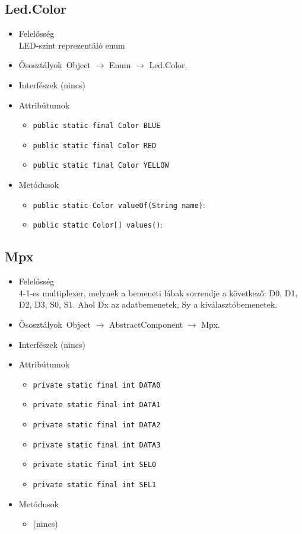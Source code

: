\subsection{Led.Color}
\begin{itemize}
\item Felelősség\\
LED-színt reprezentáló enum
\item Ősosztályok\ Object $\rightarrow{}$ Enum $\rightarrow{}$ Led.Color.
\item Interfészek (nincs)
\item Attribútumok $\ $
\begin{itemize}
	\item \texttt{public static final Color BLUE} 
	\item \texttt{public static final Color RED} 
	\item \texttt{public static final Color YELLOW} 
\end{itemize}
\item Metódusok$\ $
\begin{itemize}
	\item \texttt{public static Color valueOf(String name)}: 
	\item \texttt{public static Color[] values()}: 
\end{itemize}
\end{itemize}

\subsection{Mpx}
\begin{itemize}
\item Felelősség\\
4-1-es multiplexer, melynek a bemeneti lábak sorrendje a következő:  D0, D1, D2, D3, S0, S1. Ahol Dx az adatbemenetek, Sy a kiválasztóbemenetek.
\item Ősosztályok\ Object $\rightarrow{}$ AbstractComponent $\rightarrow{}$ Mpx.
\item Interfészek (nincs)
\item Attribútumok $\ $
\begin{itemize}
	\item \texttt{private static final int DATA0} 
	\item \texttt{private static final int DATA1} 
	\item \texttt{private static final int DATA2} 
	\item \texttt{private static final int DATA3} 
	\item \texttt{private static final int SEL0} 
	\item \texttt{private static final int SEL1} 
\end{itemize}
\item Metódusok$\ $
\begin{itemize}
\item (nincs)
\end{itemize}
\end{itemize}

